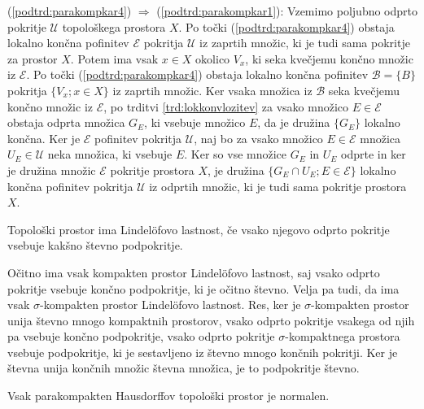 \documentclass[mat1]{fmfdelo}
\newcommand{\Ucurl}{\mathcal{U}}
\begin{document}
\begin{dokaz}
(\ref{podtrd:parakompkar4}) $\Rightarrow$ (\ref{podtrd:parakompkar1}):
Vzemimo poljubno odprto pokritje $\Ucurl$ topološkega prostora $X$. Po točki (\ref{podtrd:parakompkar4}) obstaja lokalno končna pofinitev $\mathcal{E}$ pokritja $\Ucurl$ iz zaprtih množic, ki je tudi sama pokritje za prostor $X$. Potem ima vsak $x \in X$ okolico $V_x$, ki seka kvečjemu končno množic iz $\mathcal{E}$. Po točki (\ref{podtrd:parakompkar4}) obstaja lokalno končna pofinitev $\mathcal{B} = \lbrace B \rbrace$ pokritja $\lbrace V_x ; x \in X \rbrace$ iz zaprtih množic. Ker vsaka množica iz $\mathcal{B}$ seka kvečjemu končno množic iz $\mathcal{E}$, po trditvi \ref{trd:lokkonvlozitev} za vsako množico $E \in \mathcal{E}$ obstaja odprta množica $G_E$, ki vsebuje množico $E$, da je družina $\lbrace G_E \rbrace$ lokalno končna. Ker je $\mathcal{E}$ pofinitev pokritja $\Ucurl$, naj bo za vsako množico $E \in \mathcal{E}$ množica $U_E \in \Ucurl$ neka množica, ki vsebuje $E$. Ker so vse množice $G_E$ in $U_E$ odprte in ker je družina množic $\mathcal{E}$ pokritje prostora $X$, je družina $\lbrace G_E \cap U_E ; E \in \mathcal{E} \rbrace$ lokalno končna pofinitev pokritja $\Ucurl$ iz odprtih množic, ki je tudi sama pokritje prostora $X$.
\end{dokaz}

\begin{definicija}
Topološki prostor ima Lindel\"ofovo lastnost, če vsako njegovo odprto pokritje vsebuje kakšno števno podpokritje.
\end{definicija}

Očitno ima vsak kompakten prostor Lindel\"ofovo lastnost, saj vsako odprto pokritje vsebuje končno podpokritje, ki je očitno števno. Velja pa tudi, da ima vsak $\sigma$-kompakten prostor Lindel\"ofovo lastnost. Res, ker je $\sigma$-kompakten prostor unija števno mnogo kompaktnih prostorov, vsako odprto pokritje vsakega od njih pa vsebuje končno podpokritje, vsako odprto pokritje $\sigma$-kompaktnega prostora vsebuje pod\-pok\-rit\-je, ki je sestavljeno iz števno mnogo končnih pokritji. Ker je števna unija končnih množic števna množica, je to podpokritje števno.

\begin{trditev}\label{trd:parkompnorm} %
Vsak parakompakten Hausdorffov topološki prostor je normalen.
\end{trditev}
\end{document}
